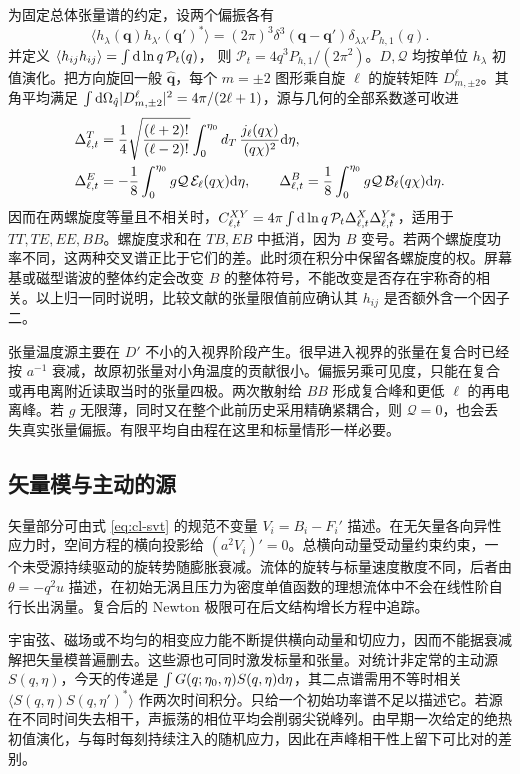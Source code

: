 为固定总体张量谱的约定，设两个偏振各有
\[
 \langle h_\lambda(\bm q)h_{\lambda'}(\bm q')^*\rangle
 =(2\pi)^3\delta^3(\bm q-\bm q')\delta_{\lambda\lambda'}P_{h,1}(q).
\]
并定义 $\langle h_{ij}h_{ij}\rangle=\int\dd\ln q\,\mathcal P_t(q)$，
则 $\mathcal P_t=4q^3P_{h,1}/(2\pi^2)$。$D,\mathcal Q$ 均按单位 $h_\lambda$ 初值演化。把方向旋回一般 $\hat{\bm q}$，每个 $m=\pm2$ 图形乘自旋 $\ell$ 的旋转矩阵 $D^\ell_{m,\pm2}$。其角平均满足 $\int\dd\Omega_{\hat q}|D^\ell_{m,\pm2}|^2=4\pi/(2\ell+1)$，源与几何的全部系数遂可收进
\begin{align}
 \Delta_{\ell,t}^{T}
   &=\frac14\sqrt{\frac{(\ell+2)!}{(\ell-2)!}}\int_0^{\eta_0}
                   d_T\,\frac{j_\ell(q\chi)}{(q\chi)^2}\dd\eta,\nonumber\\
 \Delta_{\ell,t}^{E}
   &=-\frac18\int_0^{\eta_0}g\mathcal Q\,\mathcal E_\ell(q\chi)\dd\eta,\qquad
 \Delta_{\ell,t}^{B}
   =\frac18\int_0^{\eta_0}g\mathcal Q\,\mathcal B_\ell(q\chi)\dd\eta .
 \label{eq:cl-losTensor}
\end{align}
因而在两螺旋度等量且不相关时，$C_{\ell,t}^{XY}=4\pi\int\dd\ln q\,\mathcal P_t
\Delta_{\ell,t}^X\Delta_{\ell,t}^{Y*}$，适用于 $TT,TE,EE,BB$。螺旋度求和在 $TB,EB$ 中抵消，因为 $B$ 变号。若两个螺旋度功率不同，这两种交叉谱正比于它们的差。此时须在积分中保留各螺旋度的权。屏幕基或磁型谐波的整体约定会改变 $B$ 的整体符号，不能改变是否存在宇称奇的相关。以上归一同时说明，比较文献的张量限值前应确认其 $h_{ij}$ 是否额外含一个因子二。

张量温度源主要在 $D'$ 不小的入视界阶段产生。很早进入视界的张量在复合时已经按 $a^{-1}$ 衰减，故原初张量对小角温度的贡献很小。偏振另乘可见度，只能在复合或再电离附近读取当时的张量四极。两次散射给 $BB$ 形成复合峰和更低 $\ell$ 的再电离峰。若 $g$ 无限薄，同时又在整个此前历史采用精确紧耦合，则 $\mathcal Q=0$，也会丢失真实张量偏振。有限平均自由程在这里和标量情形一样必要。

\subsection{矢量模与主动的源}

矢量部分可由式 \eqref{eq:cl-svt} 的规范不变量 $V_i=B_i-F_i'$ 描述。在无矢量各向异性应力时，空间方程的横向投影给 $(a^2V_i)'=0$。总横向动量受动量约束约束，一个未受源持续驱动的旋转势随膨胀衰减。流体的旋转与标量速度散度不同，后者由 $\theta=-q^2u$ 描述，在初始无涡且压力为密度单值函数的理想流体中不会在线性阶自行长出涡量。复合后的 Newton 极限可在后文结构增长方程中追踪。

宇宙弦、磁场或不均匀的相变应力能不断提供横向动量和切应力，因而不能据衰减解把矢量模普遍删去。这些源也可同时激发标量和张量。对统计非定常的主动源 $S(q,\eta)$，今天的传递是 $\int G(q;\eta_0,\eta)S(q,\eta)\dd\eta$，其二点谱需用不等时相关 $\langle S(q,\eta)S(q,\eta')^*\rangle$ 作两次时间积分。只给一个初始功率谱不足以描述它。若源在不同时间失去相干，声振荡的相位平均会削弱尖锐峰列。由早期一次给定的绝热初值演化，与每时每刻持续注入的随机应力，因此在声峰相干性上留下可比对的差别。

